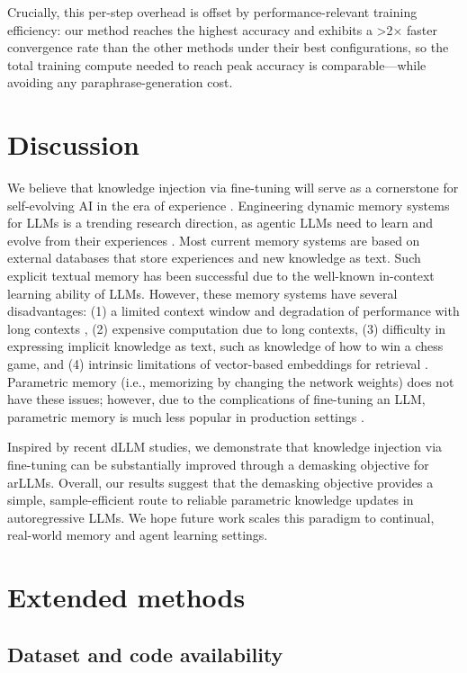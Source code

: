 Crucially, this per-step overhead is offset by performance-relevant training efficiency: our method reaches the highest accuracy and exhibits a >2× faster convergence rate than the other methods under their best configurations, so the total training compute needed to reach peak accuracy is comparable—while avoiding any paraphrase-generation cost. 

\section{Discussion}
We believe that knowledge injection via fine-tuning will serve as a cornerstone for self-evolving AI in the era of experience \citep{silver2025welcome}. Engineering dynamic memory systems for LLMs is a trending research direction, as agentic LLMs need to learn and evolve from their experiences \citep{zhang2025survey, chhikara2025mem0}. Most current memory systems are based on external databases that store experiences and new knowledge as text. Such explicit textual memory has been successful due to the well-known in-context learning ability of LLMs. However, these memory systems have several disadvantages: (1) a limited context window and degradation of performance with long contexts \citep{liu2023lost}, (2) expensive computation due to long contexts, (3) difficulty in expressing implicit knowledge as text, such as knowledge of how to win a chess game, and (4) intrinsic limitations of vector-based embeddings for retrieval \citep{weller2025theoretical}. Parametric memory (i.e., memorizing by changing the network weights) does not have these issues; however, due to the complications of fine-tuning an LLM, parametric memory is much less popular in production settings \citep{zhang2025survey}. 

Inspired by recent dLLM studies, we demonstrate that knowledge injection via fine-tuning can be substantially improved through a demasking objective for arLLMs. Overall, our results suggest that the demasking objective provides a simple, sample-efficient route to reliable parametric knowledge updates in autoregressive LLMs. We hope future work scales this paradigm to continual, real-world memory and agent learning settings.

\afterpage{\clearpage}
\section{Extended methods}
\subsection{Dataset and code availability}
\label{sec:code}


